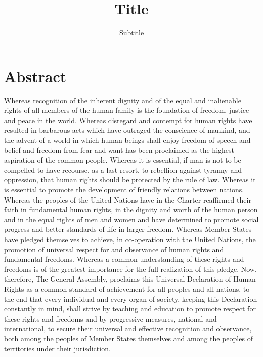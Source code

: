 \documentclass[
  titlepage,
  openright,
  DIV=calc,
  toc=listof,
  listof=nochaptergap]{scrbook}
\title{Title}
\subtitle{Subtitle}
\author{}
\date{}
\begin{document}
\frontmatter
\maketitle

\chapter*{Abstract}
\begin{spacing}{1.5}
Whereas recognition of the inherent dignity and of the equal and inalienable rights of all members of the human family is the foundation of freedom, justice and peace in the world. Whereas disregard and contempt for human rights have resulted in barbarous acts which have outraged the conscience of mankind, and the advent of a world in which human beings shall enjoy freedom of speech and belief and freedom from fear and want has been proclaimed as the highest aspiration of the common people. Whereas it is essential, if man is not to be compelled to have recourse, as a last resort, to rebellion against tyranny and oppression, that human rights should be protected by the rule of law. Whereas it is essential to promote the development of friendly relations between nations. Whereas the peoples of the United Nations have in the Charter reaffirmed their faith in fundamental human rights, in the dignity and worth of the human person and in the equal rights of men and women and have determined to promote social progress and better standards of life in larger freedom. Whereas Member States have pledged themselves to achieve, in co-operation with the United Nations, the promotion of universal respect for and observance of human rights and fundamental freedoms. Whereas a common understanding of these rights and freedoms is of the greatest importance for the full realization of this pledge. Now, therefore, The General Assembly, proclaims this Universal Declaration of Human Rights as a common standard of achievement for all peoples and all nations, to the end that every individual and every organ of society, keeping this Declaration constantly in mind, shall strive by teaching and education to promote respect for these rights and freedoms and by progressive measures, national and international, to secure their universal and effective recognition and observance, both among the peoples of Member States themselves and among the peoples of territories under their jurisdiction.
\end{spacing}
\end{document}
